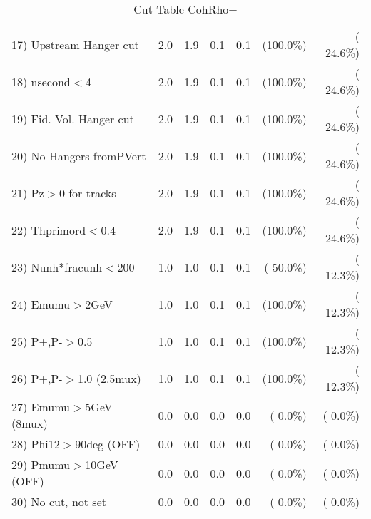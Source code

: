 \begin{table}[h!]
\begin{tabular}{||l||r|r|r|r|r|r||}
 17) Upstream Hanger cut  &          2.0 &          1.9 &          0.1 &          0.1 & (100.0\%) & ( 24.6\%) \\
 18) nsecond$<$4          &          2.0 &          1.9 &          0.1 &          0.1 & (100.0\%) & ( 24.6\%) \\
 19) Fid. Vol. Hanger cut &          2.0 &          1.9 &          0.1 &          0.1 & (100.0\%) & ( 24.6\%) \\
 20) No Hangers fromPVert &          2.0 &          1.9 &          0.1 &          0.1 & (100.0\%) & ( 24.6\%) \\
 21) Pz$>$0 for tracks    &          2.0 &          1.9 &          0.1 &          0.1 & (100.0\%) & ( 24.6\%) \\
 22) Thprimord$<$0.4      &          2.0 &          1.9 &          0.1 &          0.1 & (100.0\%) & ( 24.6\%) \\
 23) Nunh*fracunh$<$200   &          1.0 &          1.0 &          0.1 &          0.1 & ( 50.0\%) & ( 12.3\%) \\
 24) Emumu$>$2GeV         &          1.0 &          1.0 &          0.1 &          0.1 & (100.0\%) & ( 12.3\%) \\
 25) P+,P-$>$0.5          &          1.0 &          1.0 &          0.1 &          0.1 & (100.0\%) & ( 12.3\%) \\
 26) P+,P-$>$1.0 (2.5mux) &          1.0 &          1.0 &          0.1 &          0.1 & (100.0\%) & ( 12.3\%) \\
 27) Emumu$>$5GeV  (8mux) &          0.0 &          0.0 &          0.0 &          0.0 & (  0.0\%) & (  0.0\%) \\
 28) Phi12$>$90deg  (OFF) &          0.0 &          0.0 &          0.0 &          0.0 & (  0.0\%) & (  0.0\%) \\
 29) Pmumu$>$10GeV  (OFF) &          0.0 &          0.0 &          0.0 &          0.0 & (  0.0\%) & (  0.0\%) \\
 30) No cut, not set      &          0.0 &          0.0 &          0.0 &          0.0 & (  0.0\%) & (  0.0\%) \\
 \hline
 \hline
 \end{tabular}
 \caption{Cut Table  CohRho+  }
 \label{tab-cutcohjpsi-mumu_anumunc}
 \end{table}
